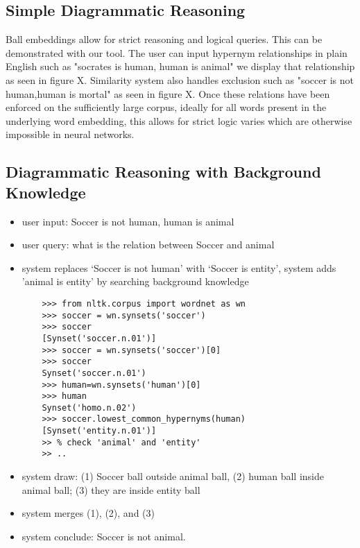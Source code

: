 \documentclass[]{article}
\begin{document}
\subsection{Simple Diagrammatic Reasoning}

Ball embeddings allow for strict reasoning and logical queries. This can be demonstrated with our tool. The user can input hypernym relationships in plain English such as "socrates is human, human is animal" we display that relationship as seen in figure X. Similarity system also handles exclusion such as "soccer is not human,human is mortal" as seen in figure X. Once these relations have been enforced on the sufficiently large corpus, ideally for all words present in the underlying word embedding, this allows for strict logic varies which are otherwise impossible in neural networks.

\subsection{Diagrammatic Reasoning with Background Knowledge} 
\begin{itemize}
	\item user input: Soccer is not human, human is animal
	\item  user query: what is the relation between Soccer and animal
	\item  system replaces `Soccer is not human' with `Soccer is entity', system adds 'animal is entity' by searching background knowledge
	\begin{verbatim}
	>>> from nltk.corpus import wordnet as wn
	>>> soccer = wn.synsets('soccer')
	>>> soccer
	[Synset('soccer.n.01')]
	>>> soccer = wn.synsets('soccer')[0]
	>>> soccer
	Synset('soccer.n.01')
	>>> human=wn.synsets('human')[0]
	>>> human
	Synset('homo.n.02') 
	>>> soccer.lowest_common_hypernyms(human)
	[Synset('entity.n.01')] 
	>> % check 'animal' and 'entity'
	>> ..
	\end{verbatim}
	\item  system draw: (1) Soccer ball outside animal ball, (2) human ball inside animal ball; (3) they are inside entity ball 
	\item system merges (1), (2), and (3)  
	\item system conclude: Soccer is not animal.
\end{itemize}
\end{document}
